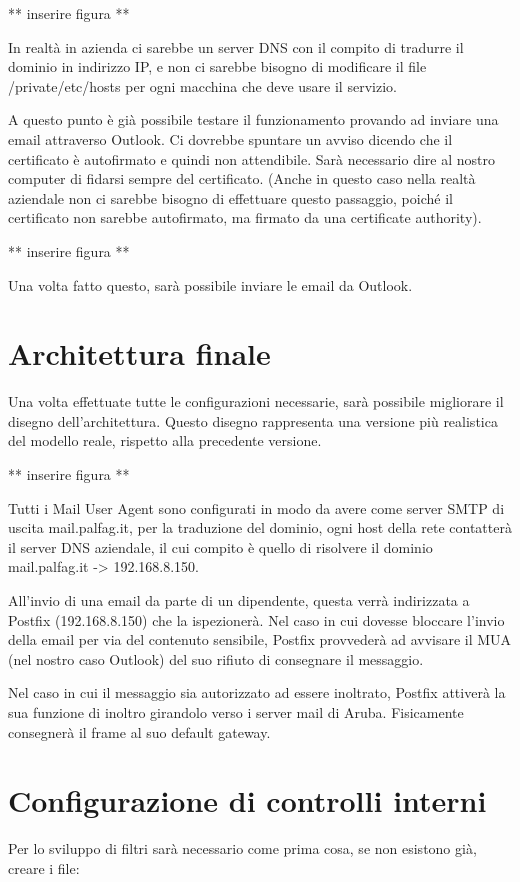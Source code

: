     ** inserire figura ** 

    In realtà in azienda ci sarebbe un server DNS con il compito di tradurre il dominio in indirizzo IP, 
    e non ci sarebbe bisogno di modificare il file /private/etc/hosts per ogni macchina che deve usare il servizio.


    A questo punto è già possibile testare il funzionamento provando ad inviare una email attraverso Outlook. 
    Ci dovrebbe spuntare un avviso dicendo che il certificato è autofirmato e quindi non attendibile. 
    Sarà necessario dire al nostro computer di fidarsi sempre del certificato.
    (Anche in questo caso nella realtà aziendale non ci sarebbe bisogno di effettuare questo passaggio, poiché 
    il certificato non sarebbe autofirmato, ma firmato da una certificate authority).

    ** inserire figura ** 

    Una volta fatto questo, sarà possibile inviare le email da Outlook.


    \section{Architettura finale}
    Una volta effettuate tutte le configurazioni necessarie, sarà possibile migliorare il disegno dell’architettura. 
    Questo disegno rappresenta una versione più realistica del modello reale, rispetto alla precedente versione.

    ** inserire figura ** 

    Tutti i Mail User Agent sono configurati in modo da avere come server SMTP di uscita mail.palfag.it, 
    per la traduzione del dominio, ogni host della rete contatterà il server DNS aziendale, il cui compito è
    quello di risolvere il dominio mail.palfag.it -> 192.168.8.150.

    All'invio di una email da parte di un dipendente, questa verrà indirizzata a Postfix (192.168.8.150) che la 
    ispezionerà. Nel caso in cui dovesse bloccare l’invio della email per via del contenuto sensibile, 
    Postfix provvederà ad avvisare il MUA (nel nostro caso Outlook) del suo rifiuto di consegnare il messaggio.

    Nel caso in cui il messaggio sia autorizzato ad essere inoltrato, Postfix attiverà la sua funzione di inoltro 
    girandolo verso i server mail di Aruba. Fisicamente consegnerà il frame al suo default gateway.


    \section{Configurazione di controlli interni}
    Per lo sviluppo di filtri sarà necessario come prima cosa, se non esistono già, creare i file:

